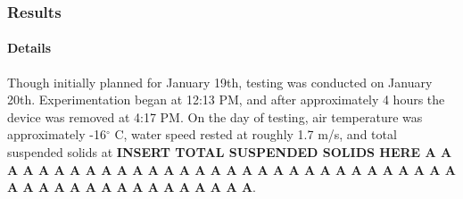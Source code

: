 \documentclass[fleqn,10pt]{SelfArx} %
\begin{document}
	\subsubsection{Results}
	\paragraph*{Details}
	Though initially planned for January 19th, testing was conducted on January 20th. Experimentation began at 12:13 PM, and after approximately 4 hours the device was removed at 4:17 PM. On the day of testing, air temperature was approximately -16$^{\circ}$ C, water speed rested at roughly 1.7 m/s, and total suspended solids at \textbf{INSERT TOTAL SUSPENDED SOLIDS HERE A A A A A A A A A A A A A A A A A A A A A A A A A A A A A A  A A A A A A A A A A A A A A A A A}.
	
	
	
\end{document}

